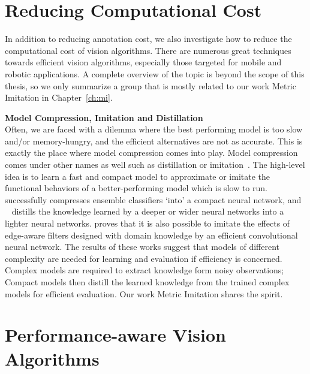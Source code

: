 \section{  {Reducing Computational Cost} }
In addition to reducing annotation cost, we also investigate how to reduce the computational cost of vision algorithms. There are numerous great techniques towards efficient vision algorithms, especially those targeted for mobile and robotic applications.  A complete overview of the topic is beyond the scope of this thesis, so we  only summarize a  group that is mostly related to our work Metric Imitation in Chapter~\ref{ch:mi}. 

\textbf{  { Model Compression, Imitation and Distillation}} \\
Often, we are faced with a dilemma where the best performing model is too slow and/or memory-hungry, and the efficient alternatives are not as accurate. This is exactly the place where model compression \citep{model:compression} comes into play.  Model compression comes under other names as well such as distillation or imitation~\citep{DistillingCNN, romero2014fitnets, policy:distilling}. The high-level idea is to learn a fast and compact model to approximate or imitate the functional behaviors  of a better-performing model which is slow to run. 
\citep{model:compression} successfully compresses ensemble classifiers `into' a compact neural network, and ~\citep{DistillingCNN, romero2014fitnets, policy:distilling} distills the knowledge learned by a deeper or wider neural networks into a lighter neural networks. 
\citep{deepfilters} proves that it is also possible to imitate the effects of edge-aware filters designed with domain knowledge by an efficient convolutional neural network.  The results of these works suggest that models of different complexity are needed for learning and evaluation if efficiency is concerned.  Complex models are required to extract knowledge form noisy observations; Compact models then distill the learned knowledge from the trained complex models for efficient evaluation. Our work Metric Imitation shares the spirit.   


\section{  {Performance-aware Vision Algorithms}}

